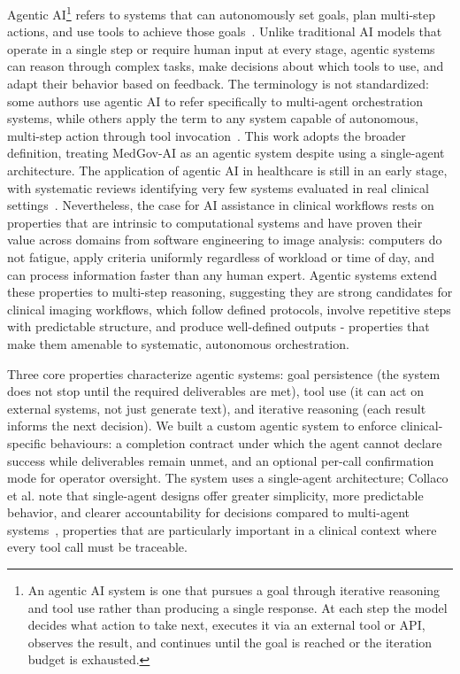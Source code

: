 \documentclass[conference]{IEEEtran}
\begin{document}
Agentic AI\footnote{An agentic AI system is one that pursues a goal through iterative reasoning and tool use rather than producing a single response. At each step the model decides what action to take next, executes it via an external tool or API, observes the result, and continues until the goal is reached or the iteration budget is exhausted.} refers to systems that can autonomously set goals, plan multi-step actions, and use tools to achieve those goals~\cite{collaco2026scoping}. Unlike traditional AI models that operate in a single step or require human input at every stage, agentic systems can reason through complex tasks, make decisions about which tools to use, and adapt their behavior based on feedback. The terminology is not standardized: some authors use agentic AI to refer specifically to multi-agent orchestration systems, while others apply the term to any system capable of autonomous, multi-step action through tool invocation~\cite{abouali2026survey}. This work adopts the broader definition, treating MedGov-AI as an agentic system despite using a single-agent architecture. The application of agentic AI in healthcare is still in an early stage, with systematic reviews identifying very few systems evaluated in real clinical settings~\cite{collaco2026scoping, dietrich2025agentic}. Nevertheless, the case for AI assistance in clinical workflows rests on properties that are intrinsic to computational systems and have proven their value across domains from software engineering to image analysis: computers do not fatigue, apply criteria uniformly regardless of workload or time of day, and can process information faster than any human expert. Agentic systems extend these properties to multi-step reasoning, suggesting they are strong candidates for clinical imaging workflows, which follow defined protocols, involve repetitive steps with predictable structure, and produce well-defined outputs - properties that make them amenable to systematic, autonomous orchestration.

Three core properties characterize agentic systems: goal persistence (the system does not stop until the required deliverables are met), tool use (it can act on external systems, not just generate text), and iterative reasoning (each result informs the next decision). We built a custom agentic system to enforce clinical-specific behaviours: a completion contract under which the agent cannot declare success while deliverables remain unmet, and an optional per-call confirmation mode for operator oversight. The system uses a single-agent architecture; Collaco et al. note that single-agent designs offer greater simplicity, more predictable behavior, and clearer accountability for decisions compared to multi-agent systems~\cite{collaco2026scoping}, properties that are particularly important in a clinical context where every tool call must be traceable.
\end{document}
